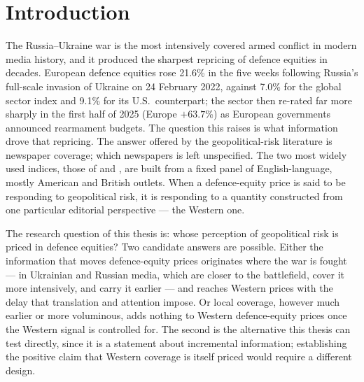 \documentclass[12pt,a4paper]{article}
\begin{document}
\newpage

\section{Introduction}

The Russia--Ukraine war is the most intensively covered armed conflict in modern media history, and it produced the sharpest repricing of defence equities in decades. European defence equities rose 21.6\% in the five weeks following Russia's full-scale invasion of Ukraine on 24 February 2022, against 7.0\% for the global sector index and 9.1\% for its U.S.\ counterpart; the sector then re-rated far more sharply in the first half of 2025 (Europe $+63.7$\%) as European governments announced rearmament budgets. The question this raises is what information drove that repricing. The answer offered by the geopolitical-risk literature is newspaper coverage; which newspapers is left unspecified. The two most widely used indices, those of \citet{caldara2022} and \citet{baker2016}, are built from a fixed panel of English-language, mostly American and British outlets. When a defence-equity price is said to be responding to geopolitical risk, it is responding to a quantity constructed from one particular editorial perspective --- the Western one.

The research question of this thesis is: whose perception of geopolitical risk is priced in defence equities? Two candidate answers are possible. Either the information that moves defence-equity prices originates where the war is fought --- in Ukrainian and Russian media, which are closer to the battlefield, cover it more intensively, and carry it earlier --- and reaches Western prices with the delay that translation and attention impose. Or local coverage, however much earlier or more voluminous, adds nothing to Western defence-equity prices once the Western signal is controlled for. The second is the alternative this thesis can test directly, since it is a statement about incremental information; establishing the positive claim that Western coverage is itself priced would require a different design.
\end{document}
